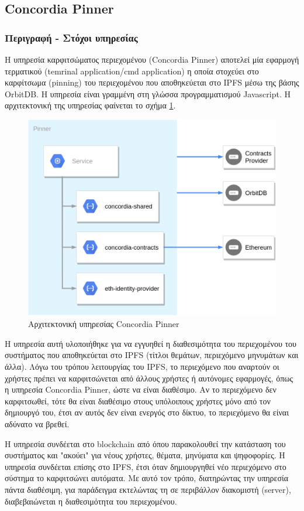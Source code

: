 \subsection{Concordia Pinner} \label{subsection:4-3-4-concordia-pinner-service}

\subsubsection{Περιγραφή - Στόχοι υπηρεσίας}

Η υπηρεσία καρφιτσώματος περιεχομένου (Concordia Pinner) αποτελεί μία εφαρμογή τερματικού (temrinal application/cmd application) η οποία στοχεύει στο καρφίτσωμα (pinning) του περιεχομένου που αποθηκεύεται στο IPFS μέσω της βάσης OrbitDB. Η υπηρεσία είναι γραμμένη στη γλώσσα προγραμματισμού Javascript. Η αρχιτεκτονική της υπηρεσίας φαίνεται το σχήμα \ref{figure:4-3-concordia-pinner-architecture}.

\begin{figure}[H]
    \centering
    \includegraphics[width=.6\textwidth]{assets/figures/chapter-4/4.3.architecture-4.3.4.concordia-pinner-architecture.png}
    \caption{Αρχιτεκτονική υπηρεσίας Concordia Pinner}
    \label{figure:4-3-concordia-pinner-architecture}
\end{figure}

Η υπηρεσία αυτή υλοποιήθηκε για να εγγυηθεί η διαθεσιμότητα του περιεχομένου του συστήματος που αποθηκεύεται στο IPFS (τίτλοι θεμάτων, περιεχόμενο μηνυμάτων και άλλα). Λόγω του τρόπου λειτουργίας του IPFS, το περιεχόμενο που αναρτούν οι χρήστες πρέπει να καρφιτσώνεται από άλλους χρήστες ή αυτόνομες εφαρμογές, όπως η υπηρεσία Concordia Pinner, ώστε να είναι διαθέσιμο. Αν το περιεχόμενο δεν καρφιτσωθεί, τότε θα είναι διαθέσιμο στους υπόλοιπους χρήστες μόνο από
τον δημιουργό του, έτσι αν αυτός δεν είναι ενεργός στο δίκτυο, το περιεχόμενο θα είναι αδύνατο να βρεθεί.

Η υπηρεσία συνδέεται στο blockchain από όπου παρακολουθεί την κατάσταση του συστήματος και "ακούει" για νέους χρήστες, θέματα, μηνύματα και ψηφοφορίες. Η υπηρεσία συνδέεται επίσης στο IPFS, έτσι όταν δημιουργηθεί νέο περιεχόμενο στο σύστημα το καρφιτσώνει αυτόματα. Με αυτό τον τρόπο, διατηρώντας την υπηρεσία πάντα διαθέσιμη, για παράδειγμα εκτελώντας τη σε περιβάλλον διακομιστή (server), διαβεβαιώνεται η διαθεσιμότητα του περιεχομένου.

